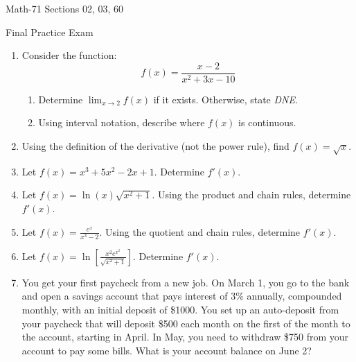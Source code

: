 \documentclass[letterpaper,12pt,fleqn]{article}
\begin{document}
\begin{center}
  \large
  Math-71 Sections 02, 03, 60

  \Large
  Final Practice Exam
\end{center}

\vspace{0.5in}

\begin{enumerate}[left=0pt]
\item Consider the function:
  \[f(x)=\frac{x-2}{x^2+3x-10}\]
  \begin{enumerate}
  \item Determine \(\displaystyle\lim_{x\to2}f(x)\) if it exists.  Otherwise, state \emph{DNE}.
  \item Using interval notation, describe where \(f(x)\) is continuous.
  \end{enumerate}

\item Using the definition of the derivative (not the power rule), find \(f(x)=\sqrt{x}\).

\item Let \(\displaystyle f(x)=x^3+5x^2-2x+1\).  Determine \(f'(x)\).

\item Let \(\displaystyle f(x)=\ln(x)\sqrt{x^2+1}\).  Using the product and chain rules, determine \(f'(x)\).

\item Let \(\displaystyle f(x)=\frac{e^x}{x^3-2}\).  Using the quotient and chain rules, determine \(f'(x)\).

\item Let \(\displaystyle f(x)=\ln\left[\frac{x^2e^{x^2}}{\sqrt{x^2+1}}\right]\).  Determine \(f'(x)\).

\item You get your first paycheck from a new job.  On March 1, you go to the bank and open a savings account that
  pays interest of 3\% annually, compounded monthly, with an initial deposit of \$1000.  You set up an auto-deposit
  from your paycheck that will deposit \$500 each month on the first of the month to the account, starting in
  April.  In May, you need to withdraw \$750 from your account to pay some bills.  What is your account balance on
  June 2?


\end{enumerate}
\end{document}
